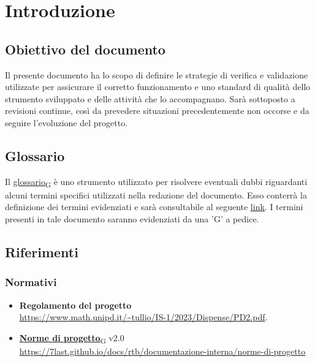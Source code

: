 \section{Introduzione}
\subsection{Obiettivo del documento}
Il presente documento ha lo scopo di definire le strategie di verifica e validazione utilizzate per assicurare il corretto funzionamento e uno standard di qualità dello strumento sviluppato e delle
attività che lo accompagnano.  Sarà sottoposto a revisioni continue, così da prevedere situazioni precedentemente non occorse e da seguire l'evoluzione del progetto.

\subsection{Glossario}
Il \href{https://7last.github.io/docs/pb/documentazione-interna/glossario\#glossario}{glossario\textsubscript{G}} è uno strumento utilizzato per risolvere eventuali dubbi riguardanti
alcuni termini specifici utilizzati nella redazione del documento.
Esso conterrà la definizione dei termini evidenziati e sarà consultabile al seguente \underline{\href{https://7last.github.io/docs/pb/documentazione-interna/glossario}{link}}. I termini presenti in tale documento saranno evidenziati da una 'G' a pedice.

\subsection{Riferimenti}
\subsubsection{Normativi}
\begin{itemize}
    \item \textbf{Regolamento del progetto} \\
        \url{https://www.math.unipd.it/~tullio/IS-1/2023/Dispense/PD2.pdf}.
    \item \href{https://7last.github.io/docs/pb/documentazione-interna/glossario\#norme-di-progetto}{\textbf{Norme di progetto}\textsubscript{G}} v2.0 \\
        \url{https://7last.github.io/docs/rtb/documentazione-interna/norme-di-progetto}
\end{itemize}

